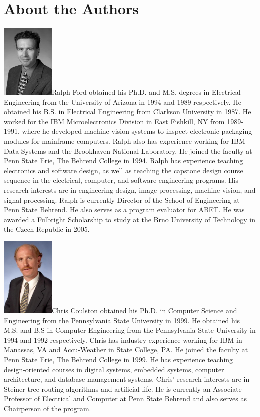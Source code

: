 \section{About the Authors}\label{about-the-authors}

\includegraphics[width=1in,height=1.39583in]{./Fig/image1.jpeg}Ralph
Ford obtained his Ph.D. and M.S. degrees in Electrical Engineering from
the University of Arizona in 1994 and 1989 respectively. He obtained his
B.S. in Electrical Engineering from Clarkson University in 1987. He
worked for the IBM Microelectronics Division in East Fishkill, NY from
1989-1991, where he developed machine vision systems to inspect
electronic packaging modules for mainframe computers. Ralph also has
experience working for IBM Data Systems and the Brookhaven National
Laboratory. He joined the faculty at Penn State Erie, The Behrend
College in 1994. Ralph has experience teaching electronics and software
design, as well as teaching the capstone design course sequence in the
electrical, computer, and software engineering programs. His research
interests are in engineering design, image processing, machine vision,
and signal processing. Ralph is currently Director of the School of
Engineering at Penn State Behrend. He also serves as a program evaluator
for ABET. He was awarded a Fulbright Scholarship to study at the Brno
University of Technology in the Czech Republic in 2005.

\includegraphics[width=1in,height=1.5in]{./Fig/image2.jpeg}Chris
Coulston obtained his Ph.D. in Computer Science and Engineering from the
Pennsylvania State University in 1999. He obtained his M.S. and B.S in
Computer Engineering from the Pennsylvania State University in 1994 and
1992 respectively. Chris has industry experience working for IBM in
Manassas, VA and Accu-Weather in State College, PA. He joined the
faculty at Penn State Erie, The Behrend College in 1999. He has
experience teaching design-oriented courses in digital systems, embedded
systems, computer architecture, and database management systems. Chris'
research interests are in Steiner tree routing algorithms and artificial
life. He is currently an Associate Professor of Electrical and Computer
at Penn State Behrend and also serves as Chairperson of the program.
